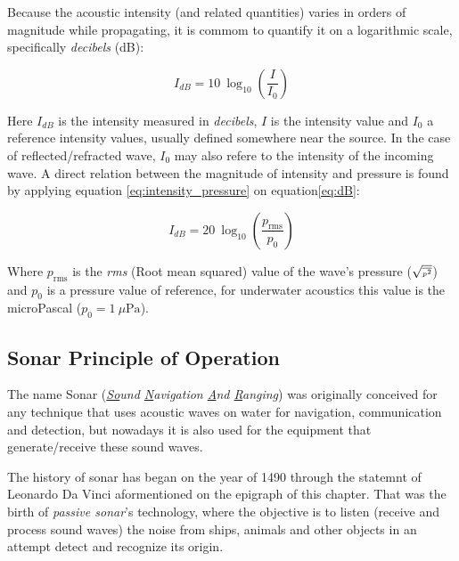 

Because the acoustic intensity (and related quantities) varies in orders of
magnitude while propagating, it is commom to quantify it on a logarithmic scale,
specifically \textit{decibels} (dB)\cite{LURTON}:

\begin{equation}\label{eq:dB}
I_{dB} = 10~\log_{10}\left(\frac{I}{I_0}\right)
\end{equation} 

Here $I_{dB}$ is the intensity measured in \textit{decibels}, $I$ is the
intensity value and $I_0$ a reference intensity values, usually defined somewhere near the
source. In the case of reflected/refracted wave, $I_0$ may also refere to
the intensity of the incoming wave. A direct relation between the magnitude of
intensity and pressure is found by applying equation \ref{eq:intensity_pressure}
on equation\ref{eq:dB}:

\begin{equation}\label{eq:dB}
I_{dB} = 20~\log_{10}\left(\frac{p_{\text{rms}}}{p_0}\right)
\end{equation}

Where $p_{\text{rms}}$ is the \textit{rms} (Root mean squared) value of the
wave's pressure ({\small $\sqrt{\text{\tiny \(\overline{p^2}\)}}$}) and $p_0$ is
a pressure value of reference, for underwater acoustics this value is the
microPascal (\(p_0 = 1~\mu\text{Pa} \))\cite{LURTON}.


\subsection{Sonar Principle of Operation}

The name Sonar (\textit{\underline{So}und \underline{N}avigation \underline{A}nd
\underline{R}anging}) was originally conceived for any technique that uses
acoustic waves on water for navigation, communication and detection, but
nowadays it is also used for the equipment that generate/receive these
sound waves.

The history of sonar has began on the year of 1490 through
the statemnt of Leonardo Da Vinci aformentioned on the epigraph 
of this chapter\cite{fahy1998fundamentals}. That was the birth of
\textit{passive sonar}'s technology, where the objective is to listen (receive
and process sound waves) the noise from ships, animals and other objects in an attempt detect and
recognize its origin.

